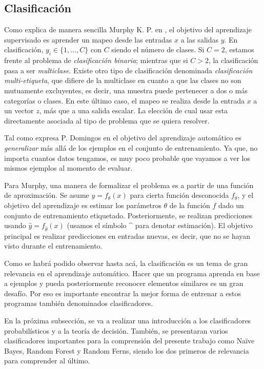 \subsection{Clasificación}

		Como explica de manera sencilla Murphy K. P. en \cite{Murphy12}, el objetivo del aprendizaje supervisado es aprender un mapeo desde las entradas $x$ a las salidas $y$. En clasificación, $y_i \in \{1,\dots,C\}$ con $C$ siendo el número de clases. Si $C=2$, estamos frente al problema de \textit{clasificación binaria}; mientras que si $C>2$, la clasificación pasa a ser \textit{multiclase}. Existe otro tipo de clasificación denominada \textit{clasificación multi-etiqueta}, que difiere de la multiclase en cuanto a que las clases no son mutuamente excluyentes, es decir, una muestra puede pertenecer a dos o más categorías o clases. En este último caso, el mapeo se realiza desde la entrada $x$ a un vector $z$, más que a una salida escalar. La elección de cual usar esta directamente asociada al tipo de problema que se quiera resolver.
		
		Tal como expresa P. Domingos en \cite{PDomingo} el objetivo del aprendizaje automático es \textit{generalizar} más allá de los ejemplos en el conjunto de entrenamiento. Ya que, no importa cuantos datos tengamos, es muy poco probable que vayamos a ver los mismos ejemplos al momento de evaluar.
		
		Para Murphy, una manera de formalizar el problema es a partir de una función de aproximación. Se asume $y = f_{\theta}(x)$ para cierta función desconocida $f_{\theta}$, y el objetivo del aprendizaje es estimar los parámetros $\theta$ de la función $f$ dado un conjunto de entrenamiento etiquetado. Posteriormente, se realizan predicciones usando $\hat{y} = f_{\hat{\theta}}(x)$ (usamos el símbolo \string^ para denotar estimación). El objetivo principal es realizar predicciones en entradas nuevas, es decir, que no se hayan visto durante el entrenamiento.
		
		Como se habrá podido observar hasta acá, la clasificación es un tema de gran relevancia en el aprendizaje automático. Hacer que un programa aprenda en base a ejemplos y pueda posteriormente reconocer elementos similares es un gran desafío. Por eso es importante encontrar la mejor forma de entrenar a estos programas también denominados clasificadores.
		
		En la próxima subsección, se va a realizar una introducción a los clasificadores probabilísticos y a la teoría de decisión. También, se presentaran varios clasificadores importantes para la comprensión del presente trabajo como Na\"{i}ve Bayes, Random Forest y Random Ferns, siendo los dos primeros de relevancia para comprender al último.
		
